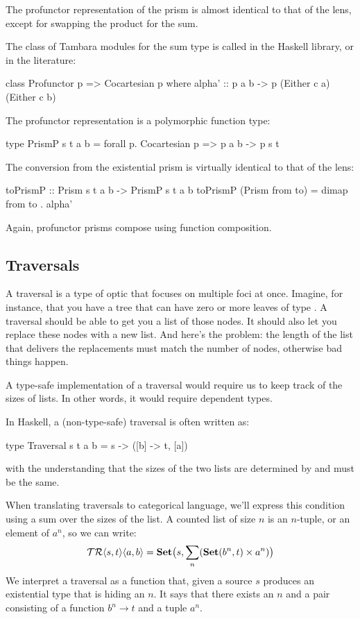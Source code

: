 \documentclass[DaoFP]{subfiles}
\begin{document}
The profunctor representation of the prism is almost identical to that of the lens, except for swapping the product for the sum. 

The class of Tambara modules for the sum type is called  in the Haskell library, or  in the literature:
\begin{haskell}
class Profunctor p => Cocartesian p where
  alpha' :: p a b -> p (Either c a) (Either c b)
\end{haskell}
The profunctor representation is a polymorphic function type:
\begin{haskell}
type PrismP s t a b = forall p. Cocartesian p => p a b -> p s t
\end{haskell}

The conversion from the existential prism is virtually identical to that of the lens:
\begin{haskell}
toPrismP :: Prism s t a b -> PrismP s t a b
toPrismP (Prism from to) = dimap from to . alpha'
\end{haskell}

Again, profunctor prisms compose using function composition.
\subsection{Traversals}
A traversal is a type of optic that focuses on multiple foci at once. Imagine, for instance, that you have a tree that can have zero or more leaves of type . A traversal should be able to get you a list of those nodes. It should also let you replace these nodes with a new list. And here's the problem: the length of the list that delivers the replacements must match the number of nodes, otherwise bad things happen. 

A type-safe implementation of a traversal would require us to keep track of the sizes of lists. In other words, it would require dependent types.

In Haskell, a (non-type-safe) traversal is often written as:
\begin{haskell}
type Traversal s t a b = s -> ([b] -> t, [a])
\end{haskell}
with the understanding that the sizes of the two lists are determined by  and must be the same. 

When translating traversals to categorical language, we'll express this condition using a sum over the sizes of the list. A counted list of size $n$ is an $n$-tuple, or an element of $a^n$, so we can write:
\[ \mathcal{TR} \langle s, t\rangle \langle a, b \rangle = \mathbf{Set} \big( s, \sum_n (\mathbf{Set} (b^n, t) \times a^n) \big) \]
We interpret a traversal as a function that, given a source $s$ produces an existential type that is hiding an $n$. It says that there exists an $n$ and a pair consisting of a function $b^n \to t$ and a tuple $a^n$. 
\end{document}
